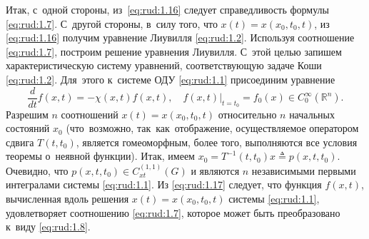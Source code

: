 Итак, с~одной стороны, из~\eqref{eq:rud:1.16} следует
справедливость формулы \eqref{eq:rud:1.7}. С~другой стороны,
в~силу того, что $x(t)=x(x_0,t_0,t)$, из \eqref{eq:rud:1.16}
получим уравнение Лиувилля \eqref{eq:rud:1.2}.
 Используя соотношение \eqref{eq:rud:1.7}, построим решение уравнения Лиувилля.
 С~этой целью запишем характеристическую систему уравнений,
 соответствующую задаче Коши \eqref{eq:rud:1.2}. Для~этого к~системе ОДУ \eqref{eq:rud:1.1}
 присоединим уравнение
 \begin{equation}
 \frac{d}{dt}f(x,t)=-\chi(x,t)  f(x,t),\quad   f(x,t)\big|_{t=t_0}=f_0(x)\in C_0^{\infty}(\mathbb  R^n).\label{eq:rud:1.17} 
 \end{equation}
 Разрешим $n$ соотношений $x(t)=x(x_0,t_0,t)$ относительно $n$
 начальных состояний $x_0$ (что~возможно, так~как~отображение,
 осуществляемое оператором сдвига $T(t,t_0)$, является гомеоморфным,
 более того, выполняются все условия теоремы о~неявной функции).
 Итак, имеем $x_0=T^{-1}(t,t_0)x\triangleq p(x,t,t_0)$. 
 Очевидно, что  $p(x,t,t_0)\in C_{xt}^{(1,1)}(G)$ и являются $n$ независимыми
 первыми интегралами системы \eqref{eq:rud:1.1}. Из \eqref{eq:rud:1.17} следует, что функция
 $f(x,t)$, вычисленная вдоль решения $x(t)=x(x_0,t_0,t)$ системы
 \eqref{eq:rud:1.1}, удовлетворяет соотношению \eqref{eq:rud:1.7}, которое может быть
 преобразовано к~виду \eqref{eq:rud:1.8}.

